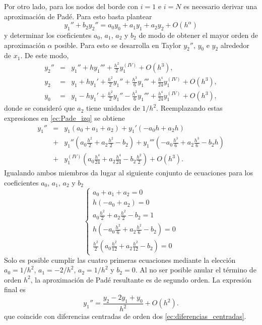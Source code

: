 \documentclass[aps,prb,twocolumn,superscriptaddress,floatfix,longbibliography]{revtex4-2}
\newif\ifptitle
\newif\ifpnumber
\newcounter{para}
\newcommand\ptitle[1]{\par\refstepcounter{para}
{\ifpnumber{\noindent\textcolor{lightgray}{\textbf{\thepara}}\indent}\fi}
{\ifptitle{\textbf{[{#1}]}}\fi}}
\begin{document}
\ptitle{Obtención del sistema lineal en el borde izquierdo}
Por otro lado, para los nodos del borde con $i = 1$ e $i = N$ es necesario derivar una aproximación de Padé. Para esto basta plantear
\begin{equation}
    y_1'' + b_2 y_2'' = a_0 y_0 + a_1 y_1 + a_2 y_2 +O(h^\alpha)
    \label{ec:Pade_izq_gral}
\end{equation}
y determinar los coeficientes $a_0$, $a_1$, $a_2$ y $b_2$ de modo de obtener el mayor orden de aproximación $\alpha$ posible. Para esto se desarrolla en Taylor $y_2''$, $y_0$ e $y_2$ alrededor de $x_1$. De este modo,
\begin{eqnarray}
    \nonumber y_2'' & = & y_1'' + h y_1''' + \frac{h^2}{2} y_1^{(IV)} + O(h^3), \\ 
    \nonumber y_2 & = & y_1 + h y_1' + \frac{h^2}{2} y_1'' + \frac{h^3}{6}y_1''' + \frac{h^4}{24} y_1^{(IV)} + O(h^3), \\
    \nonumber y_0 & = & y_1 - h y_1' + \frac{h^2}{2} y_1'' - \frac{h^3}{6}y_1''' + \frac{h^4}{24} y_1^{(IV)} + O(h^3),
\end{eqnarray}
donde se consideró que $a_2$ tiene unidades de $1/h^2$. Reemplazando estas expresiones en \ref{ec:Pade_izq} se obtiene
\begin{eqnarray}
    \nonumber y_1'' & = & y_1( a_0 + a_1 + a_2) + y_1'(-a_0 h + a_2 h) \\ 
    \nonumber & + & y_1''(a_0 \frac{h^2}{2} + a_2 \frac{h^2}{2} - b_2) + y_1'''(- a_0 \frac{h^3}{6} + a_2 \frac{h^3}{6} - b_2 h) \\
    \nonumber & + & y_1^{(IV)}(a_0 \frac{h^4}{24} + a_2 \frac{h^4}{24} - b_2 \frac{h^2}{2} ) + O(h^3).
\end{eqnarray}
Igualando ambos miembros da lugar al siguiente conjunto de ecuaciones para los coeficientes $a_0$, $a_1$, $a_2$ y $b_2$
\[\left\{\begin{matrix}
    a_0 + a_1 + a_2 = 0 \\
    h(-a_0 + a_2) = 0 \\
    a_0 \frac{h^2}{2} + a_2 \frac{h^2}{2} - b_2 = 1\\
    h(- a_0 \frac{h^2}{6} + a_2 \frac{h^2}{6} - b_2) = 0 \\
    \frac{h^2}{2}(a_0 \frac{h^2}{12} + a_2 \frac{h^2}{12} - b_2) = 0
    \end{matrix}\right.
\]
Solo es posible cumplir las cuatro primeras ecuaciones mediante la elección  $a_0 = 1/h^2$, $a_1 = -2/h^2$, $a_2 = 1/h^2$ y $b_2 = 0$. Al no ser posible anular el término de orden $h^2$, la aproximación de Padé resultante es de segundo orden. La expresión final es
\begin{equation}
    y_1'' = \frac{y_{2} - 2 y_1 + y_{0}}{h^2} + O(h^2).
    \label{eq:Pade_izq}
\end{equation}
que coincide con diferencias centradas de orden dos \ref{ec:diferencias_centradas}.
\end{document}
